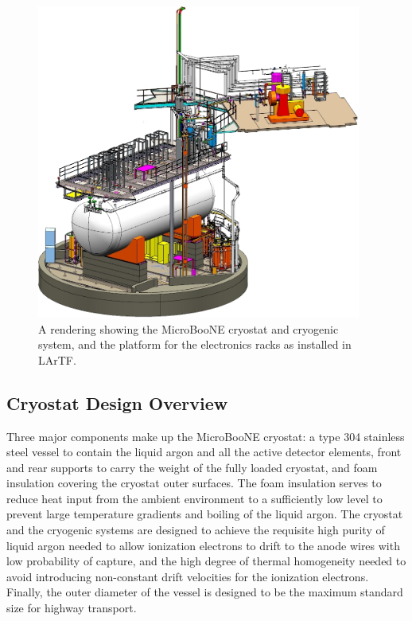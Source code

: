 \begin{figure}
\centering 
\includegraphics[width=0.95\textwidth]{figures/FULL-ASSY-1.jpg}
\caption{A rendering showing the MicroBooNE cryostat and cryogenic system, and the platform for the electronics racks as installed in LArTF.}
\label{fig:cryogenics}
\end{figure}




\subsection{Cryostat Design Overview}

Three major components make up the MicroBooNE cryostat: a type 304 stainless steel vessel to contain the liquid argon and all the active detector elements, front and rear supports to carry the weight of the fully loaded cryostat, and foam insulation covering the cryostat outer surfaces.  The foam insulation serves to reduce heat input from the ambient environment to a sufficiently low level to prevent large temperature gradients and boiling of the liquid argon. The cryostat and the cryogenic systems are designed to achieve the requisite high purity of liquid argon needed to allow ionization electrons to drift to the anode wires with low probability of capture, and the high degree of thermal homogeneity needed to avoid introducing non-constant drift velocities for the ionization electrons. Finally, the outer diameter of the vessel is designed to be the maximum standard size for highway transport.

